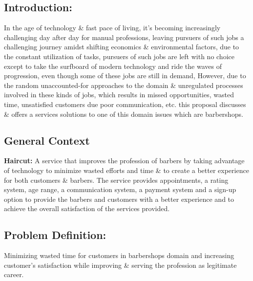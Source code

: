 \documentclass{article}
\begin{document}
      \subsection{Introduction:}
      In the age of technology \& fast pace of living, it’s becoming increasingly challenging day after day for manual professions, leaving pursuers of such jobs a challenging journey amidst shifting economics \& environmental factors, due to the constant utilization of tasks, pursuers of such jobs are left with no choice except to take the surfboard of modern technology and ride the waves of progression, even though some of these jobs are still in demand, However, due to the random unaccounted-for approaches to the domain \& unregulated processes involved in these kinds of jobs, which results in missed opportunities, wasted time, unsatisfied customers due poor communication, etc. this proposal discusses \& offers a services solutions to one of this domain issues which are barbershops.
      \subsection{General Context}
      \textbf{Haircut:} A service that improves the profession of barbers by taking advantage of technology to minimize wasted efforts and time \& to create a better experience for both customers \& barbers. The service provides appointments, a rating system, age range, a communication system, a payment system and a sign-up option to provide the barbers and customers with a better experience and to achieve the overall satisfaction of the services provided.
      \subsection{Problem Definition: }
      Minimizing wasted time for customers in barbershops domain and increasing customer’s satisfaction while improving \& serving the profession as legitimate career.
\end{document}
